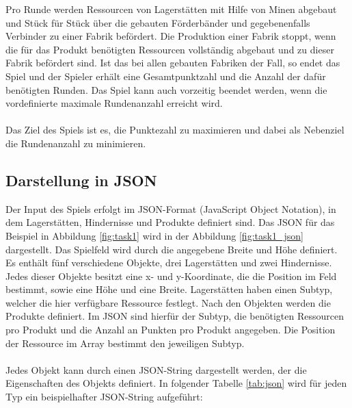 Pro Runde werden Ressourcen von Lagerstätten mit Hilfe von Minen abgebaut und Stück für Stück über die gebauten Förderbänder und gegebenenfalls Verbinder zu einer Fabrik befördert. 
Die Produktion einer Fabrik stoppt, wenn die für das Produkt benötigten Ressourcen vollständig abgebaut und zu dieser Fabrik befördert sind.
Ist das bei allen gebauten Fabriken der Fall, so endet das Spiel und der Spieler erhält eine Gesamtpunktzahl und die Anzahl der dafür benötigten Runden. Das Spiel kann auch vorzeitig beendet werden, wenn die vordefinierte maximale Rundenanzahl erreicht wird.
\\\\
Das Ziel des Spiels ist es, die Punktezahl zu maximieren und dabei als Nebenziel die Rundenanzahl zu minimieren.


\subsection{Darstellung in JSON}
Der Input des Spiels erfolgt im JSON-Format (JavaScript Object Notation), in dem Lagerstätten, Hindernisse und Produkte definiert sind. Das JSON für das Beispiel in Abbildung \ref{fig:task1} wird in der Abbildung \ref{fig:task1_json} dargestellt.
Das Spielfeld wird durch die angegebene Breite und Höhe definiert. Es enthält fünf verschiedene Objekte, drei Lagerstätten und zwei Hindernisse. Jedes dieser Objekte besitzt eine x- und y-Koordinate, die die Position im Feld bestimmt, sowie eine Höhe und eine Breite. Lagerstätten haben einen Subtyp, welcher die hier verfügbare Ressource festlegt. Nach den Objekten werden die Produkte definiert. Im JSON sind hierfür der Subtyp, die benötigten Ressourcen pro Produkt und die Anzahl an Punkten pro Produkt angegeben. Die Position der Ressource im Array bestimmt den jeweiligen Subtyp.
\\\\
Jedes Objekt kann durch einen JSON-String dargestellt werden, der die Eigenschaften des Objekts definiert. In folgender Tabelle \ref{tab:json} wird für jeden Typ ein beispielhafter JSON-String aufgeführt:

